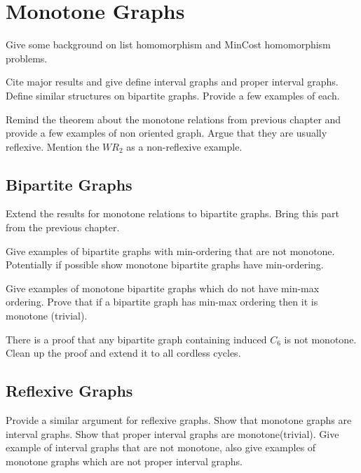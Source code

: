 \chapter{Monotone Graphs}
Give some background on list homomorphism and MinCost homomorphism problems.

Cite major results and give define interval graphs and proper interval graphs. Define similar structures 
on bipartite graphs. Provide a few examples of each.


Remind the theorem about the monotone relations from previous chapter and provide a few examples of
non oriented graph. Argue that they are usually reflexive. Mention the \(WR_2\) as a non-reflexive
example.

\section{Bipartite Graphs}
Extend the results for monotone relations to bipartite graphs. Bring this part from the previous chapter.

Give examples of bipartite graphs with min-ordering that are not monotone.
Potentially if possible show monotone bipartite graphs have min-ordering.

Give examples of monotone bipartite graphs which do not have min-max ordering.
Prove that if a bipartite graph has min-max ordering then it is monotone (trivial).

There is a proof that any bipartite graph containing induced \(C_6\) is not monotone.
Clean up the proof and extend it to all cordless cycles.

\section{Reflexive Graphs}
Provide a similar argument for reflexive graphs. Show that monotone graphs are interval graphs.
Show that proper interval graphs are monotone(trivial). Give example of interval graphs that
are not monotone, also give examples of monotone graphs which are not proper interval graphs.
